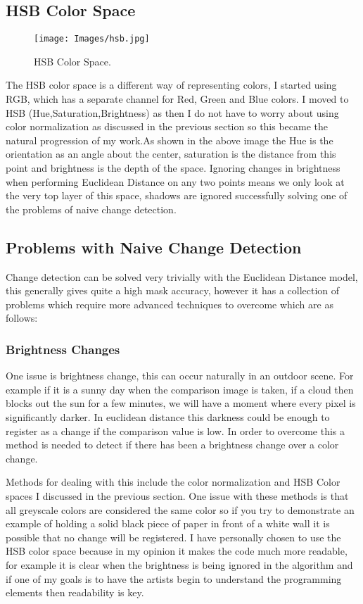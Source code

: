 \documentclass[a4paper]{report}
\begin{document}
\subsection{HSB Color Space}
\begin{figure}[!ht]
\centering
\texttt{[image: Images/hsb.jpg]}
\caption{\label{fig:Doughnut}HSB Color Space.}
\end{figure}
The HSB color space is a different way of representing colors, I started using RGB, which has a separate channel for Red, Green and Blue colors. I moved to HSB (Hue,Saturation,Brightness) as then I do not have to worry about using color normalization as discussed in the previous section so this became the natural progression of my work.As shown in the above image the Hue is the orientation as an angle about the center, saturation is the distance from this point and brightness is the depth of the space. Ignoring changes in brightness when performing Euclidean Distance on any two points means we only look at the very top layer of this space, shadows are ignored successfully solving one of the problems of naive change detection.

\subsection{Problems with Naive Change Detection}
Change detection can be solved very trivially with the Euclidean Distance model, this generally gives quite a high mask accuracy, however it has a collection of problems which require more advanced techniques to overcome which are as follows:

\subsubsection{Brightness Changes}
One issue is brightness change, this can occur naturally in an outdoor scene. For example if it is a sunny day when the comparison image is taken, if a cloud then blocks out the sun for a few minutes, we will have a moment where every pixel is significantly darker. In euclidean distance this darkness could be enough to register as a change if the comparison value is low. In order to overcome this a method is needed to detect if there has been a brightness change over a color change.

Methods for dealing with this include the color normalization and HSB Color spaces I discussed in the previous section. One issue with these methods is that all greyscale colors are considered the same color so if you try to demonstrate an example of holding a solid black piece of paper in front of a white wall it is possible that no change will be registered. I have personally chosen to use the HSB color space because in my opinion it makes the code much more readable, for example it is clear when the brightness is being ignored in the algorithm and if one of my goals is to have the artists begin to understand the programming elements then readability is key.
\end{document}
